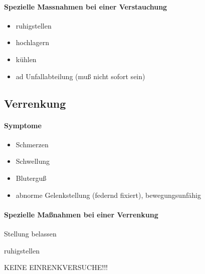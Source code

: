 \begin{gMassnahmenEnv}
    \paragraph{Spezielle Massnahmen bei einer Verstauchung}
    \begin{itemize}
        \item ruhigstellen
        \item hochlagern
        \item k\"uhlen
        \item ad Unfallabteilung (mu{\ss} nicht sofort sein)
    \end{itemize}

    
    
\end{gMassnahmenEnv}

\subsection{Verrenkung}


\paragraph{Symptome}
\begin{itemize}
    \item Schmerzen
    \item Schwellung
    \item Blutergu{\ss}
    \item abnorme Gelenkstellung (federnd fixiert), bewegungsunf\"ahig
\end{itemize}



\begin{gMassnahmenEnv}
    \paragraph{Spezielle Maßnahmen bei einer Verrenkung}
    
    Stellung belassen
    
    ruhigstellen
    
    KEINE EINRENKVERSUCHE!!!
\end{gMassnahmenEnv}




